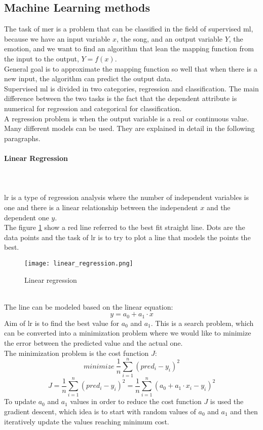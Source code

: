 \subsection{Machine Learning methods}
The task of \gls{mer} is a problem that can be classified in the field of supervised \gls{ml}, because we have an input variable $x$, the song, and an output variable $Y$, the emotion, and we want to find an algorithm that lean the mapping function from the input to the output, $Y=f(x)$.
\\ \indent
General goal is to approximate the mapping function so well that when there is a new input, the algorithm can predict the output data.
\\
Supervised \gls{ml} is divided in two categories, regression and classification. The main difference between the two tasks is the fact that the dependent attribute is numerical for regression and categorical for classification.
\\ \indent
A regression problem is when the output variable is a real or continuous value. Many different models can be used. They are explained in detail in the following paragraphs.

\paragraph{Linear Regression}
\mbox{} \\ \\
\gls{lr} is a type of regression analysis where the number of independent variables is one and there is a linear relationship between the independent $x$ and the dependent one $y$.
\\
The figure \ref{fig:linear_regression} show a red line referred to the best fit straight line. Dots are the data points and the task of \gls{lr} is to try to plot a line that models the points the best.
\begin{figure}[h]
    \centering
    \texttt{[image: linear\_regression.png]} 
	\caption{Linear regression}
    \label{fig:linear_regression}
\end{figure} 
\\
The line can be modeled based on the linear equation:
\begin{equation}
	y=a_0+a_1\cdot x
\end{equation}
Aim of \gls{lr} is to find the best value for $a_0$ and $a_1$. This is a search problem, which can be converted into a minimization problem where we would like to minimize the error between the predicted value and the actual one.
\\
The minimization problem is the cost function $J$:
\begin{equation}
	minimize \: \dfrac{1}{n} \sum_{i=1}^n{{(pred_i-y_i)}^2}
\end{equation}
\begin{equation}
	J=\dfrac{1}{n} \sum_{i=1}^n{{(pred_i-y_i)}^2}=\dfrac{1}{n} \sum_{i=1}^n{{(a_0+a_1\cdot x_i-y_i)}^2}
\end{equation}
To update $a_0$ and $a_1$ values in order to reduce the cost function $J$ is used the gradient descent, which idea is to start with random values of $a_0$ and $a_1$ and then iteratively update the values reaching minimum cost.

